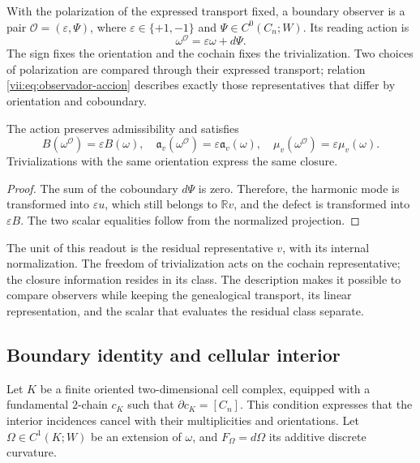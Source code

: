 \begin{definition}
\label{vii:def:observador-borde}
With the polarization of the expressed transport fixed, a boundary observer
is a pair \(\mathcal O=(\varepsilon,\Psi)\), where
\(\varepsilon\in\{+1,-1\}\) and \(\Psi\in C^0(C_n;W)\).
Its reading action is
\begin{equation}
 \omega^{\mathcal O}=\varepsilon\omega+d\Psi.
 \label{vii:eq:observador-accion}
\end{equation}
The sign fixes the orientation and the cochain fixes the trivialization.
Two choices of polarization are compared through their expressed
transport; relation \eqref{vii:eq:observador-accion} describes
exactly those representatives that differ by orientation and coboundary.
\end{definition}

\begin{proposition}
\label{vii:prop:observador-covarianza}
The action preserves admissibility and satisfies
\[
 B(\omega^{\mathcal O})=\varepsilon B(\omega),\quad
 \mathfrak a_v(\omega^{\mathcal O})=\varepsilon\mathfrak a_v(\omega),
 \quad \mu_v(\omega^{\mathcal O})=\varepsilon\mu_v(\omega).
\]
Trivializations with the same orientation express the same closure.
\end{proposition}

\begin{proof}
The sum of the coboundary \(d\Psi\) is zero. Therefore, the harmonic mode
is transformed into \(\varepsilon u\), which still belongs to
\(\mathbb Rv\), and the defect is transformed into \(\varepsilon B\).
The two scalar equalities follow from the normalized projection.
\end{proof}

The unit of this readout is the residual representative \(v\), with its
internal normalization. The freedom of trivialization acts on the
cochain representative; the closure information resides in its
class. The description makes it possible to compare observers while keeping
the genealogical transport, its linear representation, and the scalar
that evaluates the residual class separate.

\subsection{Boundary identity and cellular interior}
\label{vii:sec:observador-stokes}

Let \(K\) be a finite oriented two-dimensional cell complex,
equipped with a fundamental \(2\)-chain \(c_K\) such that
\(\partial c_K=[C_n]\). This condition expresses that the interior
incidences cancel with their multiplicities and orientations.
Let \(\Omega\in C^1(K;W)\) be an extension of \(\omega\), and
\(F_\Omega=d\Omega\) its additive discrete curvature.

